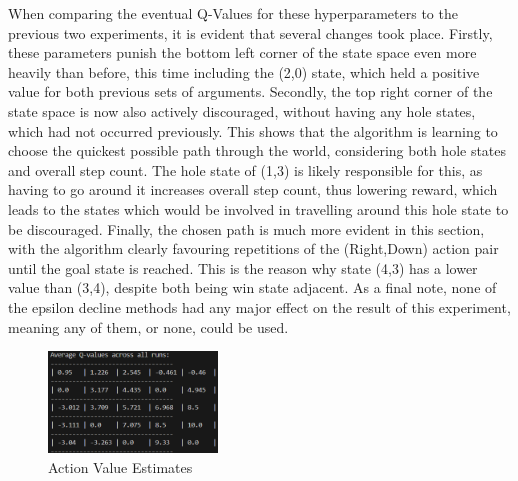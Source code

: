 \documentclass[a4paper,9pt]{scrartcl}
\begin{document}
When comparing the eventual Q-Values for these hyperparameters to the previous two experiments, it is evident that several changes took place.
Firstly, these parameters punish the bottom left corner of the state space even more heavily than before, this time including the (2,0) state,
which held a positive value for both previous sets of arguments. Secondly, the top right corner of the state space is now also actively 
discouraged, without having any hole states, which had not occurred previously. This shows that the algorithm is learning to choose the quickest 
possible path through the world, considering both hole states and overall step count. The hole state of (1,3) is likely responsible for this,
as having to go around it increases overall step count, thus lowering reward, which leads to the states which would be involved in travelling 
around this hole state to be discouraged. Finally, the chosen path is much more evident in this section, with the algorithm clearly favouring
repetitions of the (Right,Down) action pair until the goal state is reached. This is the reason why state (4,3) has a lower value than (3,4),
despite both being win state adjacent. As a final note, none of the epsilon decline methods had any major effect on the result of this 
experiment, meaning any of them, or none, could be used.


\begin{figure}[H]
\centering
\includegraphics[width=0.4\textwidth]{images/qvalues(3).png}
\caption{Action Value Estimates}
\label{fig:set3_qvalues}
\end{figure}
\end{document}

